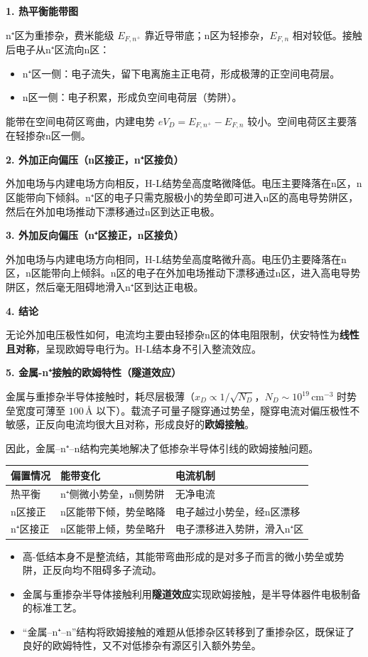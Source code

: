 \begin{derivationbox}[标准解题过程]
\textbf{1. 热平衡能带图}

n⁺区为重掺杂，费米能级 $E_{F,n^+}$ 靠近导带底；n区为轻掺杂，$E_{F,n}$ 相对较低。接触后电子从n⁺区流向n区：
\begin{itemize}
    \item n⁺区一侧：电子流失，留下电离施主正电荷，形成极薄的正空间电荷层。
    \item n区一侧：电子积累，形成负空间电荷层（势阱）。
\end{itemize}
能带在空间电荷区弯曲，内建电势 $eV_D=E_{F,n^+}-E_{F,n}$ 较小。空间电荷区主要落在轻掺杂n区一侧。

\textbf{2. 外加正向偏压（n区接正，n⁺区接负）}

外加电场与内建电场方向相反，H-L结势垒高度略微降低。电压主要降落在n区，n区能带向下倾斜。n⁺区的电子只需克服极小的势垒即可进入n区的高电导势阱区，然后在外加电场推动下漂移通过n区到达正电极。

\textbf{3. 外加反向偏压（n⁺区接正，n区接负）}

外加电场与内建电场方向相同，H-L结势垒高度略微升高。电压仍主要降落在n区，n区能带向上倾斜。n区的电子在外加电场推动下漂移通过n区，进入高电导势阱区，然后毫无阻碍地滑入n⁺区到达正电极。

\textbf{4. 结论}

无论外加电压极性如何，电流均主要由轻掺杂n区的体电阻限制，伏安特性为\textbf{线性且对称}，呈现欧姆导电行为。H-L结本身不引入整流效应。

\textbf{5. 金属-n⁺接触的欧姆特性（隧道效应）}

金属与重掺杂半导体接触时，耗尽层极薄（$x_D\propto1/\sqrt{N_D}$，$N_D\sim10^{19}\,\text{cm}^{-3}$ 时势垒宽度可薄至 $100\,\text{Å}$ 以下）。载流子可量子隧穿通过势垒，隧穿电流对偏压极性不敏感，正反向电流均很大且对称，形成良好的\textbf{欧姆接触}。

因此，金属--n⁺--n结构完美地解决了低掺杂半导体引线的欧姆接触问题。
\end{derivationbox}

\begin{formulabox}[答案汇总]
\begin{center}
\begin{tabular}{lll}
\toprule
\textbf{偏置情况} & \textbf{能带变化} & \textbf{电流机制} \\
\midrule
热平衡 & n⁺侧微小势垒，n侧势阱 & 无净电流 \\
n区接正 & n区能带下倾，势垒略降 & 电子越过小势垒，经n区漂移 \\
n⁺区接正 & n区能带上倾，势垒略升 & 电子漂移进入势阱，滑入n⁺区 \\
\bottomrule
\end{tabular}
\end{center}
\end{formulabox}

\begin{insightbox}[物理图像]
\begin{itemize}
    \item 高-低结本身不是整流结，其能带弯曲形成的是对多子而言的微小势垒或势阱，正反向均不阻碍多子流动。
    \item 金属与重掺杂半导体接触利用\textbf{隧道效应}实现欧姆接触，是半导体器件电极制备的标准工艺。
    \item ``金属--n⁺--n''结构将欧姆接触的难题从低掺杂区转移到了重掺杂区，既保证了良好的欧姆特性，又不对低掺杂有源区引入额外势垒。
\end{itemize}
\end{insightbox}
